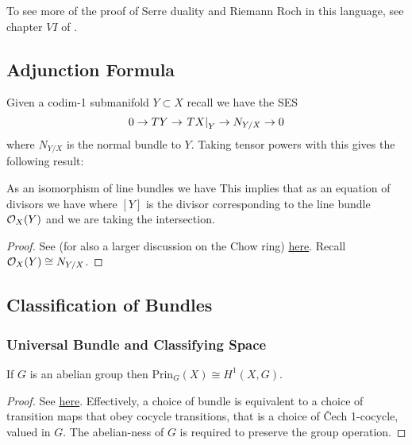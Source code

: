 \documentclass{article}
\begin{document}
\begin{remark}
	To see more of the proof of Serre duality and Riemann Roch in this language, see chapter $VI$ of \cite{Miranda1995}.  
\end{remark}
\subsection{Adjunction Formula}
Given a codim-1 submanifold $Y \subset X$ recall we have the SES 
\[
0 \to TY \to \left. TX \right\rvert_{Y} \to N_{Y/X} \to 0
\]
where $N_{Y/X}$ is the normal bundle to $Y$. Taking tensor powers with this gives the following result:
\begin{theorem}
	As an isomorphism of line bundles we have 
This implies that as an equation of divisors we have
where $[Y]$ is the divisor corresponding to the line bundle $\mathcal{O}_X(Y)$ and we are taking the intersection.  
\end{theorem}
\begin{proof}
	See (for also a larger discussion on the Chow ring) \href{https://scholar.harvard.edu/files/joeharris/files/000-final-3264.pdf}{here}. Recall $\mathcal{O}_X(Y) \cong N_{Y/X}$.   
\end{proof}


\subsection{Classification of Bundles}
\subsubsection{Universal Bundle and Classifying Space}

\begin{prop}\label{prop: principal bundles cong H^1}
	If $G$ is an abelian group then $\text{Prin}_G(X) \cong H^1(X,G)$. 
\end{prop}
\begin{proof}
	See \href{https://math.colorado.edu/~rohi1040/expository/param_spin.pdf}{here}. Effectively, a choice of bundle is equivalent to a choice of transition maps that obey cocycle transitions, that is a choice of \v{C}ech 1-cocycle, valued in $G$. The abelian-ness of $G$ is required to preserve the group operation.  
\end{proof}
\end{document}
